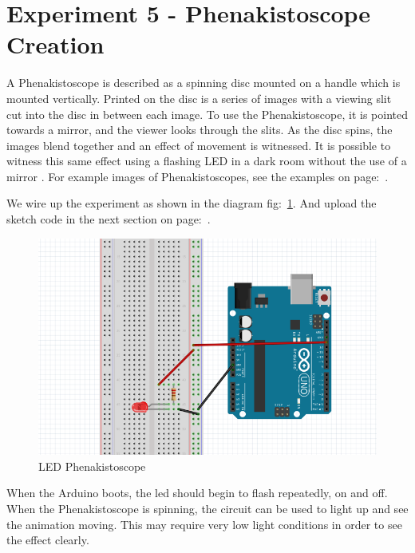 \chapter*{Experiment 5 - Phenakistoscope Creation}
A Phenakistoscope is described as a spinning disc mounted on a handle which is mounted vertically. Printed on the disc is a series of images with a viewing slit cut into the disc in between each image. To use the Phenakistoscope, it is pointed towards a mirror, and the viewer looks through the slits. As the disc spins, the images blend together and an effect of movement is witnessed. It is possible to witness this same effect using a flashing LED in a dark room without the use of a mirror \citep{kalif-15-a} \citep{kalif-15-b} \cite{pepi-11}. For example images of Phenakistoscopes, see the examples on page:~\pageref{fig:phenakistoscopes}.

We wire up the experiment as shown in the diagram fig:~\ref{fig:exp5_phenakistoscope}. And upload the sketch code in the next section on page:~\pageref{sketch:exp5}.

%
\begin{figure}[ht]
	\centering
	\includegraphics[width=12cm]{images/07}
	\caption{LED Phenakistoscope \citep{fritzing-15}}
	\label{fig:exp5_phenakistoscope}
\end{figure}
%

When the Arduino boots, the led should begin to flash repeatedly, on and off. When the \gls{Phenakistoscope} is spinning, the circuit can be used to light up and see the animation moving. This may require very low light conditions in order to see the effect clearly.

